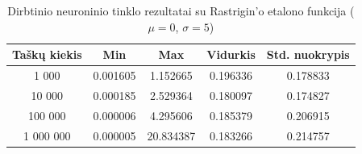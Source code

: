 \begin{table}[H]
    \centering
    \begin{tabular}{|c|c|c|c|c|}
        \hline
        \textbf{Taškų kiekis} & \textbf{Min} & \textbf{Max} & \textbf{Vidurkis} & \textbf{Std. nuokrypis} \\ \hline
        1 000        & 0.001605 & 1.152665 & 0.196336 & 0.178833 \\ \hline
        10 000       & 0.000185 & 2.529364 & 0.180097 & 0.174827 \\ \hline
        100 000      & 0.000006 & 4.295606 & 0.185379 & 0.206915 \\ \hline
        1 000 000    & 0.000005 & 20.834387 & 0.183266 & 0.214757 \\ \hline
    \end{tabular}
    \caption{Dirbtinio neuroninio tinklo rezultatai su Rastrigin'o etalono funkcija ($\mu = 0$, $\sigma = 5$)}
\end{table}